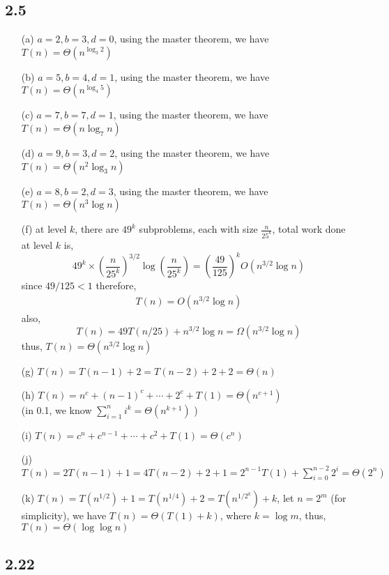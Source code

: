\documentclass[twoside]{homework}
\begin{document}
\subsection*{2.5}
\begin{enumerate}
	\item [(a)] $a = 2, b = 3, d = 0$, using the master theorem, we have $T(n) = \Theta(n^{\log_3 2})$
	\item [(b)] $a = 5, b = 4, d = 1$, using the master theorem, we have $T(n) = \Theta(n^{\log_4 5})$
	\item [(c)] $a = 7, b = 7, d = 1$, using the master theorem, we have $T(n) = \Theta(n\log_7 n)$
	\item [(d)] $a = 9, b = 3, d = 2$, using the master theorem, we have $T(n) = \Theta(n^2\log_3 n)$
	\item [(e)] $a = 8, b = 2, d = 3$, using the master theorem, we have $T(n) = \Theta(n^3\log n)$
	\item [(f)] at level $k$, there are $49^k$ subproblems, each with size $\frac{n}{25^k}$, total work done at level $k$ is,
		\[ 49^k \times (\frac{n}{25^k})^{3/2}\log (\frac{n}{25^k}) = (\frac{49}{125})^kO(n^{3/2}\log n)\]
	since $49/125 < 1$ therefore,
		\begin{align*}
			T(n) = O(n^{3/2}\log n)
		\end{align*}
	also,
	\[ T(n) = 49T(n/25) + n^{3/2}\log n = \Omega(n^{3/2}\log n)\]
	thus, $T(n) = \Theta(n^{3/2}\log n)$

	\item [(g)] $T(n) = T(n-1) + 2 = T(n-2) + 2 + 2 = \Theta(n)$
	\item [(h)] $T(n) = n^c + (n-1)^c + \cdots + 2^c + T(1) = \Theta(n^{c+1})$
	\ \\
	(in 0.1, we know $\sum_{i=1}^n i^k = \Theta(n^{k+1})$ )
	\item [(i)] $T(n) = c^n + c^{n-1} + \cdots + c^2 + T(1) = \Theta(c^n)$
	\item [(j)] $T(n) = 2T(n-1) + 1 = 4T(n-2) + 2 + 1 = 2^{n-1}T(1) + \sum_{i=0}^{n-2}2^i = \Theta(2^n)$
	\item [(k)] $T(n) = T(n^{1/2}) + 1 = T(n^{1/4}) + 2 = T(n^{1/2^k}) + k$, let $n = 2^m$ (for simplicity), we have $T(n) = \Theta(T(1) + k)$, where $k = \log m$, thus, $T(n) = \Theta(\log \log n)$
\end{enumerate}

\subsection*{2.22}
\end{document}

